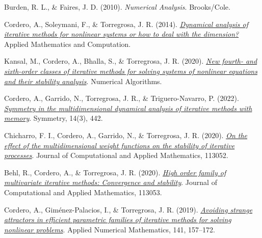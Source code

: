 \documentclass[12pt]{article}
\begin{document}
\cleardoublepage
{}
{}
\begin{thebibliography}{9}

Burden, R. L., \& Faires, J. D. (2010). 
\textit{Numerical Analysis}. Brooks/Cole.

Cordero, A., Soleymani, F., \& Torregrosa, J. R. (2014).  
\href{https://doi.org/10.1016/j.amc.2014.07.010}
{\textit{Dynamical analysis of iterative methods for nonlinear systems or how to deal with the dimension?}} 
Applied Mathematics and Computation.

Kansal, M., Cordero, A., Bhalla, S., \& Torregrosa, J. R. (2020).  
\href{https://doi.org/10.1007/s11075-020-00997-4}
{\textit{New fourth- and sixth-order classes of iterative methods for solving systems of nonlinear equations and their stability analysis}}. 
Numerical Algorithms.

Cordero, A., Garrido, N., Torregrosa, J. R., \& Triguero-Navarro, P. (2022).  
\href{https://doi.org/10.3390/sym14030442}
{\textit{Symmetry in the multidimensional dynamical analysis of iterative methods with memory}}. 
Symmetry, 14(3), 442.

Chicharro, F. I., Cordero, A., Garrido, N., \& Torregrosa, J. R. (2020).  
\href{https://doi.org/10.1016/j.cam.2020.113052}
{\textit{On the effect of the multidimensional weight functions on the stability of iterative processes}}. 
Journal of Computational and Applied Mathematics, 113052.

Behl, R., Cordero, A., \& Torregrosa, J. R. (2020).  
\href{https://doi.org/10.1016/j.cam.2020.113053}
{\textit{High order family of multivariate iterative methods: Convergence and stability}}. 
Journal of Computational and Applied Mathematics, 113053.

Cordero, A., Giménez-Palacios, I., \& Torregrosa, J. R. (2019).  
\href{https://doi.org/10.1016/j.apnum.2018.12.006}
{\textit{Avoiding strange attractors in efficient parametric families of iterative methods for solving nonlinear problems}}. 
Applied Numerical Mathematics, 141, 157–172.

\end{thebibliography}
\end{document}
